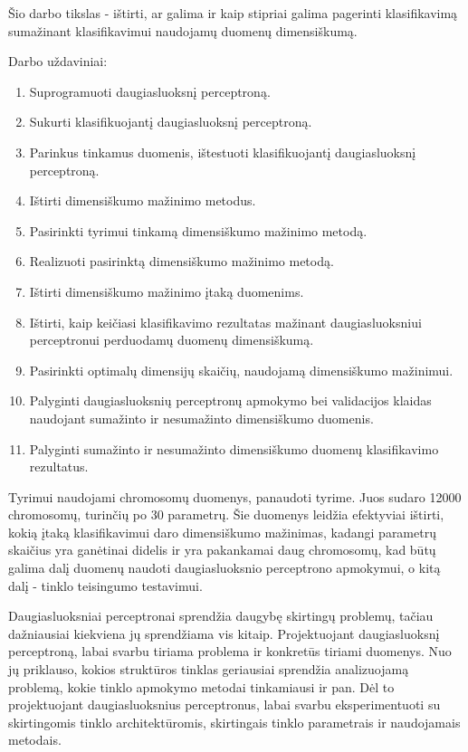 \documentclass{VUMIFPSbakalaurinis}
\begin{document}
Šio darbo tikslas - ištirti, ar galima ir kaip stipriai galima pagerinti klasifikavimą sumažinant klasifikavimui naudojamų duomenų dimensiškumą.

Darbo uždaviniai:
\begin{enumerate}
	\item Suprogramuoti daugiasluoksnį perceptroną.
	\item Sukurti klasifikuojantį daugiasluoksnį perceptroną.
	\item Parinkus tinkamus duomenis, ištestuoti klasifikuojantį daugiasluoksnį perceptroną.

	\item Ištirti dimensiškumo mažinimo metodus.
	\item Pasirinkti tyrimui tinkamą dimensiškumo mažinimo metodą.
	\item Realizuoti pasirinktą dimensiškumo mažinimo metodą.
	\item Ištirti dimensiškumo mažinimo įtaką duomenims.
	
	\item Ištirti, kaip keičiasi klasifikavimo rezultatas mažinant daugiasluoksniui perceptronui perduodamų duomenų dimensiškumą.
	\item Pasirinkti optimalų dimensijų skaičių, naudojamą dimensiškumo mažinimui.
	\item Palyginti daugiasluoksnių perceptronų apmokymo bei validacijos klaidas naudojant sumažinto ir nesumažinto dimensiškumo duomenis.
	\item Palyginti sumažinto ir nesumažinto dimensiškumo duomenų klasifikavimo rezultatus.
\end{enumerate}

Tyrimui naudojami chromosomų duomenys, panaudoti \cite[289~psl.]{price-dimensionality-reduction} tyrime.
Juos sudaro 12000 chromosomų, turinčių po 30 parametrų.
Šie duomenys leidžia efektyviai ištirti, kokią įtaką klasifikavimui daro dimensiškumo mažinimas, kadangi parametrų skaičius yra ganėtinai didelis ir yra pakankamai daug chromosomų, kad būtų galima dalį duomenų naudoti daugiasluoksnio perceptrono apmokymui, o kitą dalį - tinklo teisingumo testavimui.

Daugiasluoksniai perceptronai sprendžia daugybę skirtingų problemų, tačiau dažniausiai kiekviena jų sprendžiama vis kitaip.
Projektuojant daugiasluoksnį perceptroną, labai svarbu tiriama problema ir konkretūs tiriami duomenys.
Nuo jų priklauso, kokios struktūros tinklas geriausiai sprendžia analizuojamą problemą, kokie tinklo apmokymo metodai tinkamiausi ir pan.
Dėl to projektuojant daugiasluoksnius perceptronus, labai svarbu eksperimentuoti su skirtingomis tinklo architektūromis, skirtingais tinklo parametrais ir naudojamais metodais.
\end{document}
